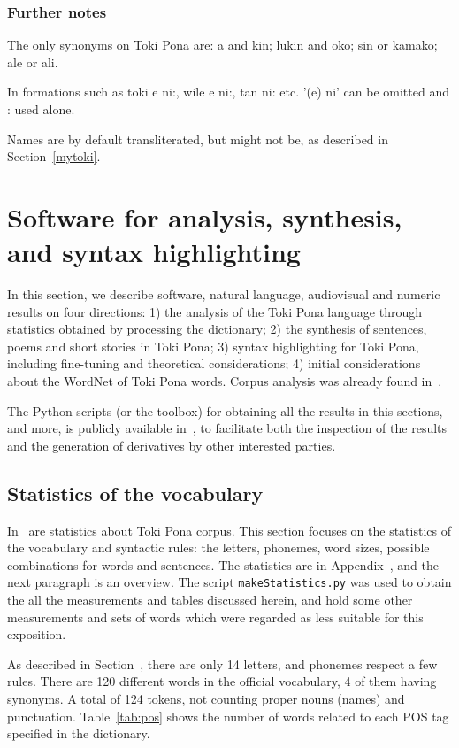 \documentclass{article}
\newcommand{\tttt}[1]{\texttt{#1}}
\begin{document}
\subsubsection{Further notes}
The only synonyms on Toki Pona are:
a and kin; lukin and oko;
sin or kamako;
ale or ali.

In formations such as
toki e ni:, wile e ni:, tan ni: etc.
'(e) ni' can be omitted and : used alone.

Names are by default transliterated,
but might not be, as described in Section~\ref{mytoki}.


\section{Software for analysis, synthesis, and syntax highlighting}\label{hacks}
In this section,
we describe software, natural language, audiovisual and numeric results
on four directions:
1)
the analysis of the Toki Pona language through statistics
obtained by processing the dictionary;
2)
the synthesis of sentences, poems and short stories
in Toki Pona;
3)
syntax highlighting for Toki Pona,
including fine-tuning and theoretical
considerations;
4)
initial considerations about the WordNet of
Toki Pona words.
Corpus analysis was already found in~\cite{}.

The Python scripts (or the toolbox)
for obtaining all the results in this sections,
and more, is publicly available in~\cite{tokipona},
to facilitate both the inspection of the results and the
generation of derivatives by other interested parties.


\subsection{Statistics of the vocabulary}\label{sec:stat}
In~\cite{pije} are statistics about Toki Pona corpus.
This section focuses on the statistics of the vocabulary
and syntactic rules:
the letters, phonemes, word sizes,
possible combinations for words and sentences.
The statistics are in Appendix~\cite{listings},
and the next paragraph is an overview.
The script \tttt{makeStatistics.py}
was used to obtain the all the measurements and tables
discussed herein,
and hold some other measurements and sets of words
which were regarded as less suitable for this exposition.

As described in Section~\cite{basics},
there are only 14 letters,
and phonemes respect a few rules.
There are 120 different words in the official vocabulary,
4 of them having synonyms.
A total of 124 tokens,
not counting proper nouns (names)
and punctuation.
Table~\ref{tab:pos} shows the number of words
related to each POS tag specified in the dictionary.
\end{document}
